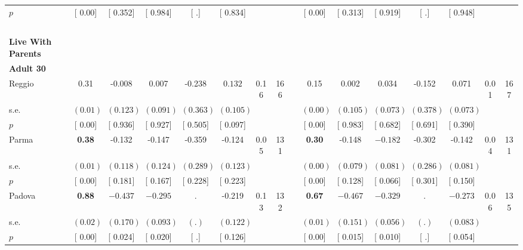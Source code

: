 \begin{longtable}{L{8em} c c c c c c c p{1em} c c c c c c c}
\quad \quad \quad \quad $ p$ & [     0.00] & [    0.352] & [    0.984] & [        .] & [    0.834] & & & & [     0.00] & [    0.313] & [    0.919] & [        .] & [    0.948] & &  \\[1em]
~\\[1em]
\textbf{Live With Parents} \\*
\quad \quad \textbf{Adult 30} & & & & & & & & & & & & & & & \\* 
\quad \quad \quad Reggio& 0.31 &    -0.008 &     0.007 &    -0.238 & $ \mathbf{    0.132}$ &      0.16 &       166 & & 0.15 &     0.002 &     0.034 &    -0.152 &     0.071 &      0.01 &       167  \\*
\quad \quad \quad \quad s.e.& $ (     0.01)$ & $ (    0.123)$ & $ (    0.091)$ & $ (    0.363)$ & $ (    0.105)$ & & & & $ (     0.00)$ & $ (    0.105)$ & $ (    0.073)$ & $ (    0.378)$ & $ (    0.073)$ & &  \\*
\quad \quad \quad \quad $ p$ & [     0.00] & [    0.936] & [    0.927] & [    0.505] & [    0.097] & & & & [     0.00] & [    0.983] & [    0.682] & [    0.691] & [    0.390] & &  \\[1em]
\quad \quad \quad Parma& \textbf{     0.38} &    -0.132 &    -0.147 &    -0.359 &    -0.124 &      0.05 &       131 & & \textbf{     0.30} &    -0.148 & $ \mathbf{   -0.182}$ &    -0.302 &    -0.142 &      0.04 &       131  \\*
\quad \quad \quad \quad s.e.& $ (     0.01)$ & $ (    0.118)$ & $ (    0.124)$ & $ (    0.289)$ & $ (    0.123)$ & & & & $ (     0.00)$ & $ (    0.079)$ & $ (    0.081)$ & $ (    0.286)$ & $ (    0.081)$ & &  \\*
\quad \quad \quad \quad $ p$ & [     0.00] & [    0.181] & [    0.167] & [    0.228] & [    0.223] & & & & [     0.00] & [    0.128] & [    0.066] & [    0.301] & [    0.150] & &  \\[1em]
\quad \quad \quad Padova& \textbf{     0.88} & $ \mathbf{   -0.437}$ & $ \mathbf{   -0.295}$ &         . &    -0.219 &      0.13 &       132 & & \textbf{     0.67} & $ \mathbf{   -0.467}$ & $ \mathbf{   -0.329}$ &         . & $ \mathbf{   -0.273}$ &      0.06 &       135  \\*
\quad \quad \quad \quad s.e.& $ (     0.02)$ & $ (    0.170)$ & $ (    0.093)$ & $ (        .)$ & $ (    0.122)$ & & & & $ (     0.01)$ & $ (    0.151)$ & $ (    0.056)$ & $ (        .)$ & $ (    0.083)$ & &  \\*
\quad \quad \quad \quad $ p$ & [     0.00] & [    0.024] & [    0.020] & [        .] & [    0.126] & & & & [     0.00] & [    0.015] & [    0.010] & [        .] & [    0.054] & &  \\[1em]

\end{longtable}
